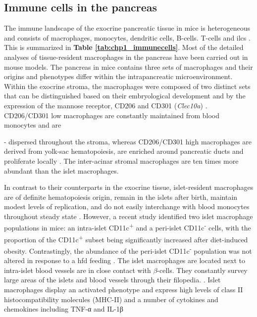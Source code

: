 \subsection{Immune cells in the pancreas}
The immune landscape of the exocrine pancreatic tissue in mice is heterogeneous and consists of macrophages, monocytes, dendritic cells, B-cells. T-cells and \glspl{ilc} \textbf{\cite{calderon_pancreas_2015}}. This is summarized in \textbf{Table \ref{tab:chp1_immunecells}}. Most of the detailed analyses of tissue-resident macrophages in the pancreas have been carried out in mouse models. The pancreas in mice contains three sets of macrophages and their origins and phenotypes differ within the intrapancreatic microenvironment. Within the exocrine stroma, the macrophages were composed of two distinct sets that can be distinguished based on their embryological development and by the expression of the mannose receptor, CD206 and CD301 (\textit{Clec10a}) \textbf{\cite{calderon_pancreas_2015,cruz_macrophages_2020}}. CD206/CD301 low macrophages are constantly maintained from blood monocytes and are 



- dispersed throughout the stroma, whereas CD206/CD301 high macrophages are derived from yolk-sac hematopoiesis, are enriched around pancreatic ducts and proliferate locally \textbf{\cite{calderon_pancreas_2015,cruz_macrophages_2020}}. The inter-acinar stromal macrophages are ten times more abundant than the islet macrophages.\\
\par In contrast to their counterparts in the exocrine tissue, islet-resident macrophages are of definite hematopoiesis origin, remain in the islets after birth, maintain modest levels of replication, and do not easily interchange with blood monocytes throughout steady state \textbf{\cite{calderon_pancreas_2015,cruz_macrophages_2020,carrero_resident_2017}}. However, a recent study identified two islet macrophage populations in mice: an intra-islet CD11c\textsuperscript{+} and a peri-islet CD11c\textsuperscript{-} cells, with the proportion of the CD11c\textsuperscript{+} subset being significantly increased after diet-induced obesity. Contrastingly, the abundance of the peri-islet CD11c\textsuperscript{-} population was not altered in response to a \gls{hfd} feeding \textbf{\cite{ying_expansion_2019}}. The islet macrophages are located next to intra-islet blood vessels are in close contact with $\beta$-cells. They constantly survey large areas of the islets and blood vessels through their filopedia. \textbf{\cite{carrero_resident_2017,calderon_dendritic_2008,zinselmeyer_resident_2018}}. Islet macrophages display an activated phenotype and express high levels of class II histocompatibility molecules (MHC-II) and a number of cytokines and chemokines including TNF-α and IL-1β \textbf{\cite{calderon_pancreas_2015,carrero_resident_2017,ferris_islet-resident_2017}}




